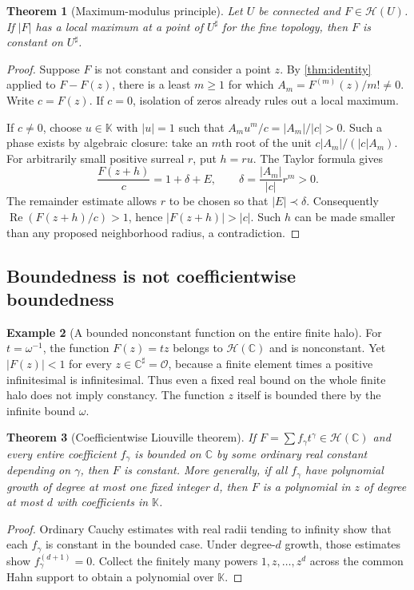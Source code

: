 \documentclass[11pt,letterpaper]{article}
\numberwithin{equation}{section}
\newtheorem{theorem}{Theorem}[section]
\theoremstyle{definition}
\newtheorem{example}[theorem]{Example}
\theoremstyle{remark}
\newcommand{\K}{\mathbb{K}}
\newcommand{\C}{\mathbb{C}}
\newcommand{\OO}{\mathcal{O}}
\newcommand{\HH}{\mathcal{H}}
\begin{document}
\begin{theorem}[Maximum-modulus principle]\label{thm:maximum}
Let $U$ be connected and $F\in\HH(U)$. If $|F|$ has a local maximum at a
point of $U^\sharp$ for the fine topology, then $F$ is constant on
$U^\sharp$.
\end{theorem}
\begin{proof}
Suppose $F$ is not constant and consider a point $z$. By
\cref{thm:identity} applied to $F-F(z)$, there is a least $m\ge1$ for which
$A_m=F^{(m)}(z)/m!\ne0$. Write $c=F(z)$. If $c=0$, isolation of zeros
already rules out a local maximum.

If $c\ne0$, choose $u\in\K$ with $|u|=1$ such that
$A_mu^m/c=|A_m|/|c|>0$. Such a phase exists by algebraic closure: take an
$m$th root of the unit $c|A_m|/(|c|A_m)$.
For arbitrarily small positive surreal $r$, put $h=ru$. The Taylor formula
gives
\[
 \frac{F(z+h)}c=1+\delta+E,
 \qquad \delta=\frac{|A_m|}{|c|}r^m>0.
\]
The remainder estimate allows $r$ to be chosen so that $|E|\prec\delta$.
Consequently $\operatorname{Re}(F(z+h)/c)>1$, hence $|F(z+h)|>|c|$.
Such $h$ can be made smaller than any proposed neighborhood radius, a
contradiction.
\end{proof}

\subsection{Boundedness is not coefficientwise boundedness}

\begin{example}[A bounded nonconstant function on the entire finite halo]\label{ex:liouville}
For $t=\omega^{-1}$, the function $F(z)=tz$ belongs to $\HH(\C)$ and is
nonconstant. Yet $|F(z)|<1$ for every $z\in\C^\sharp=\OO$, because a
finite element times a positive infinitesimal is infinitesimal. Thus even a
fixed real bound on the whole finite halo does not imply constancy.
The function $z$ itself is bounded there by the infinite bound $\omega$.
\end{example}

\begin{theorem}[Coefficientwise Liouville theorem]\label{thm:liouville}
If $F=\sum f_\gamma t^\gamma\in\HH(\C)$ and every entire coefficient
$f_\gamma$ is bounded on $\C$ by some ordinary real constant depending on
$\gamma$, then $F$ is constant. More generally, if all $f_\gamma$ have
polynomial growth of degree at most one fixed integer $d$, then $F$ is a
polynomial in $z$ of degree at most $d$ with coefficients in $\K$.
\end{theorem}
\begin{proof}
Ordinary Cauchy estimates with real radii tending to infinity show that each
$f_\gamma$ is constant in the bounded case. Under degree-$d$ growth, those
estimates show $f_\gamma^{(d+1)}=0$. Collect the finitely many powers
$1,z,\ldots,z^d$ across the common Hahn support to obtain a polynomial over
$\K$.
\end{proof}
\end{document}

